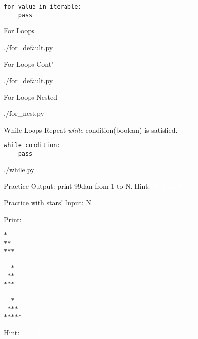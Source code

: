 \documentclass{beamer}
\begin{document}
\begin{frame}[fragile]
  \begin{lstlisting}
for value in iterable:
    pass
  \end{lstlisting}
\end{frame}

\begin{frame}{For Loops}
  \begin{lstinputlisting}[firstline=1, lastline=14]
    {./for_default.py}
  \end{lstinputlisting}
\end{frame}

\begin{frame}{For Loops Cont'}
  \begin{lstinputlisting}[firstline=1, lastline=14]
    {./for_default.py}
  \end{lstinputlisting}
\end{frame}

\begin{frame}{For Loops Nested}
  \begin{lstinputlisting}
    {./for_nest.py}
  \end{lstinputlisting}
\end{frame}

\begin{frame}{While Loops}
  Repeat \textit{while} condition(boolean) is satisfied.
\end{frame}

\begin{frame}[fragile]
  \begin{lstlisting}
while condition:
    pass
  \end{lstlisting}
\end{frame}

\begin{frame}[fragile]
  \begin{lstinputlisting}
    {./while.py}
  \end{lstinputlisting}
\end{frame}

\begin{frame}{Practice}
  Output: print 99dan from 1 to N.
  Hint: \textcolor{white}{Nest for loops}
\end{frame}


\begin{frame}[fragile]{Practice with stars!}
  Input: N

  Print:
  \begin{lstlisting}
*
**
***

  *
 **
***

  *
 ***
*****
  \end{lstlisting}
  Hint: \textcolor{white}{'*' * k}
\end{frame}
\end{document}
